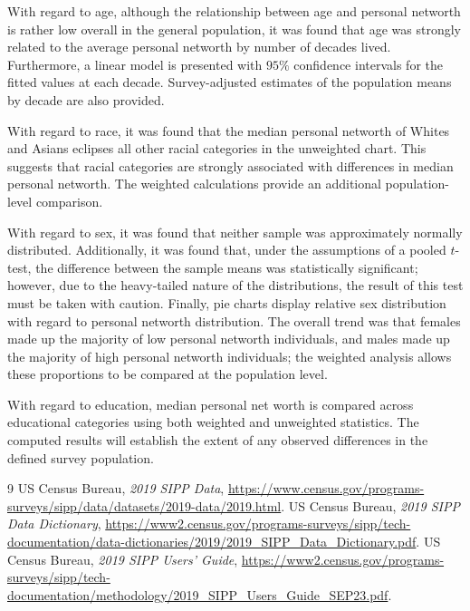 \documentclass[11pt]{article}
\begin{document}
With regard to age, although the relationship between age and personal networth is rather low overall in the general population, it was found that age was strongly related to the average personal networth by number of decades lived. Furthermore, a linear model is presented with $95\%$ confidence intervals for the fitted values at each decade. Survey-adjusted estimates of the population means by decade are also provided.

With regard to race, it was found that the median personal networth of Whites and Asians eclipses all other racial categories in the unweighted chart. This suggests that racial categories are strongly associated with differences in median personal networth. The weighted calculations provide an additional population-level comparison.

With regard to sex, it was found that neither sample was approximately normally distributed. Additionally, it was found that, under the assumptions of a pooled $t$-test, the difference between the sample means was statistically significant; however, due to the heavy-tailed nature of the distributions, the result of this test must be taken with caution. Finally, pie charts display relative sex distribution with regard to personal networth distribution. The overall trend was that females made up the majority of low personal networth individuals, and males made up the majority of high personal networth individuals; the weighted analysis allows these proportions to be compared at the population level.

With regard to education, median personal net worth is compared across educational categories using both weighted and unweighted statistics. The computed results will establish the extent of any observed differences in the defined survey population.

\begin{thebibliography}{9}
 US Census Bureau, \emph{2019 SIPP Data}, \url{https://www.census.gov/programs-surveys/sipp/data/datasets/2019-data/2019.html}.
 US Census Bureau, \emph{2019 SIPP Data Dictionary}, \url{https://www2.census.gov/programs-surveys/sipp/tech-documentation/data-dictionaries/2019/2019_SIPP_Data_Dictionary.pdf}.
 US Census Bureau, \emph{2019 SIPP Users' Guide}, \url{https://www2.census.gov/programs-surveys/sipp/tech-documentation/methodology/2019_SIPP_Users_Guide_SEP23.pdf}.
\end{thebibliography}
\end{document}

